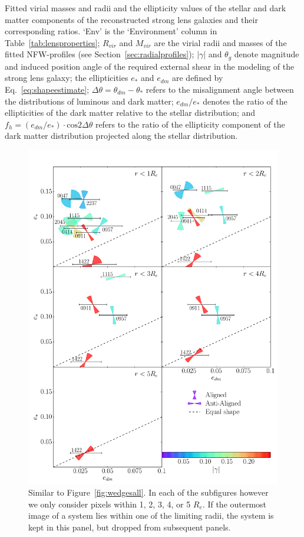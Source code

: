 \documentclass[useAMS,usenatbib]{mn2e}
\begin{document}
\begin{table}
\begin{center}
    \caption{Fitted virial masses and radii and the ellipticity values of the stellar and dark matter components of the reconstructed strong lens galaxies and their corresponding ratios. `Env' is the `Environment' column in Table~\ref{tab:lensproperties}; $R_{vir}$ and $M_{vir}$ are the virial radii and masses of the fitted NFW-profiles (see Section~\ref{sec:radialprofiles}); $|\gamma|$ and $\theta_{g}$ denote magnitude and induced position angle of the required external shear in the modeling of the strong lens galaxy; the ellipticities $e_{*}$ and $e_{dm}$ are defined by Eq.~\ref{eq:shapeestimate}; $\Delta\theta=\theta_{dm}-\theta_{*}$ refers to the misalignment angle between the distributions of luminous and dark matter; $e_{dm}/e_{*}$ denotes the ratio of the ellipticities of the dark matter relative to the stellar distribution; and $f_h=(e_{dm}/e_{*})\cdot\mathrm{cos} 2\Delta\theta$ refers to the ratio of the ellipticity component of the dark matter distribution projected along the stellar distribution.}
    \label{tab:ellipratios}
  \end{center}
\end{table}

\begin{figure}
  \centering
  \includegraphics[width=.75\linewidth]{Figures/wedges.pdf}
  \caption[width=\linewidth]{Similar to Figure~\ref{fig:wedgesall}. In each of the subfigures however we only consider pixels within 1, 2, 3, 4, or 5 $R_e$. If the outermost image of a system lies within one of the limiting radii, the system is kept in this panel, but dropped from subsequent panels.}
  \label{fig:wedgesradii}
\end{figure}
\end{document}
